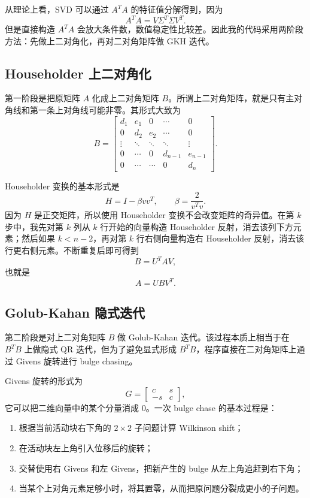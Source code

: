 \documentclass[UTF8,a4paper,12pt]{ctexart}
\begin{document}
从理论上看，SVD 可以通过 $A^TA$ 的特征值分解得到，因为
\[
A^TA = V\Sigma^T\Sigma V^T.
\]
但是直接构造 $A^TA$ 会放大条件数，数值稳定性比较差。因此我的代码采用两阶段方法：先做上二对角化，再对二对角矩阵做 GKH 迭代。

\subsection{Householder 上二对角化}

第一阶段是把原矩阵 $A$ 化成上二对角矩阵 $B$。所谓上二对角矩阵，就是只有主对角线和第一条上对角线可能非零。其形式大致为
\[
B=\begin{bmatrix}
d_1 & e_1 & 0 & \cdots & 0\\
0 & d_2 & e_2 & \cdots & 0\\
\vdots & \ddots & \ddots & \ddots & \vdots\\
0 & \cdots & 0 & d_{n-1} & e_{n-1}\\
0 & \cdots & \cdots & 0 & d_n
\end{bmatrix}.
\]

Householder 变换的基本形式是
\[
H = I - \beta vv^T, \qquad \beta = \frac{2}{v^Tv}.
\]
因为 $H$ 是正交矩阵，所以使用 Householder 变换不会改变矩阵的奇异值。在第 $k$ 步中，我先对第 $k$ 列从 $k$ 行开始的向量构造 Householder 反射，消去该列下方元素；然后如果 $k<n-2$，再对第 $k$ 行右侧向量构造右 Householder 反射，消去该行更右侧元素。不断重复后即可得到
\[
B = U^T A V,
\]
也就是
\[
A = U B V^T.
\]

\subsection{Golub-Kahan 隐式迭代}

第二阶段是对上二对角矩阵 $B$ 做 Golub-Kahan 迭代。该过程本质上相当于在 $B^TB$ 上做隐式 QR 迭代，但为了避免显式形成 $B^TB$，程序直接在二对角矩阵上通过 Givens 旋转进行 bulge chasing。

Givens 旋转的形式为
\[
G=\begin{bmatrix}
c&s\\
-s&c
\end{bmatrix},
\]
它可以把二维向量中的某个分量消成 0。一次 bulge chase 的基本过程是：
\begin{enumerate}
  \item 根据当前活动块右下角的 $2\times2$ 子问题计算 Wilkinson shift；
  \item 在活动块左上角引入位移后的旋转；
  \item 交替使用右 Givens 和左 Givens，把新产生的 bulge 从左上角追赶到右下角；
  \item 当某个上对角元素足够小时，将其置零，从而把原问题分裂成更小的子问题。
\end{enumerate}
\end{document}
